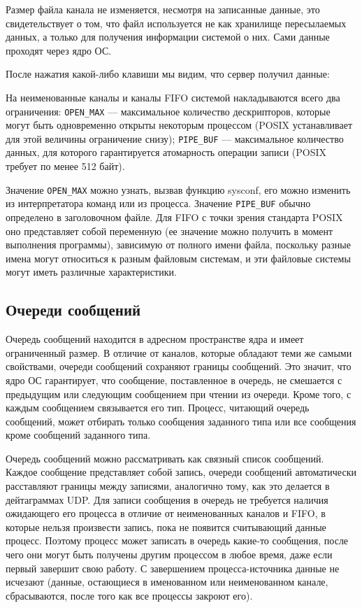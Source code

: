 \documentclass[a4paper]{article}
\begin{document}
 	Размер файла канала не изменяется, несмотря на записанные данные, это свидетельствует о том, что файл используется не как хранилище пересылаемых данных, а только для получения информации системой о них. Сами данные проходят через ядро ОС.
 	
 	После нажатия какой-либо клавиши мы видим, что сервер получил данные:
	

	На неименованные каналы и каналы FIFO системой накладываются всего два ограничения: \texttt{OPEN\_MAX} --- максимальное количество дескрипторов, которые могут быть одновременно открыты некоторым процессом (POSIX устанавливает для этой величины ограничение снизу); \texttt{PIPE\_BUF} --- максимальное количество данных, для которого гарантируется атомарность операции записи (POSIX требует по менее 512 байт).
	
	Значение \texttt{OPEN\_MAX} можно узнать, вызвав функцию sysconf, его можно изменить из интерпретатора команд или из процесса. Значение \texttt{PIPE\_BUF} обычно определено в заголовочном файле. Для FIFO с точки зрения стандарта POSIX оно представляет собой переменную (ее значение можно получить в момент выполнения программы), зависимую от полного имени файла, поскольку разные имена могут относиться к разным файловым системам, и эти файловые системы могут иметь различные характеристики.

\subsection{Очереди сообщений}
	Очередь сообщений находится в адресном пространстве ядра и имеет ограниченный размер. В отличие от каналов, которые обладают теми же самыми свойствами, очереди сообщений сохраняют границы сообщений. Это значит, что ядро ОС гарантирует, что сообщение, поставленное в очередь, не смешается с предыдущим или следующим сообщением при чтении из очереди. Кроме того, с каждым сообщением связывается его тип. Процесс, читающий очередь сообщений, может отбирать только сообщения заданного типа или все сообщения кроме сообщений заданного типа.
	
	Очередь сообщений можно рассматривать как связный список сообщений. Каждое сообщение представляет собой запись, очереди сообщений автоматически расставляют границы между записями, аналогично тому, как это делается в дейтаграммах UDP. Для записи сообщения в очередь не требуется наличия ожидающего его процесса в отличие от неименованных каналов и FIFO, в которые нельзя произвести запись, пока не появится считывающий данные процесс. Поэтому процесс может записать в очередь какие-то сообщения, после чего они могут быть получены другим процессом в любое время, даже если первый завершит свою работу. С завершением процесса-источника данные не исчезают (данные, остающиеся в именованном или неименованном канале, сбрасываются, после того как все процессы закроют его).
	
\end{document}
